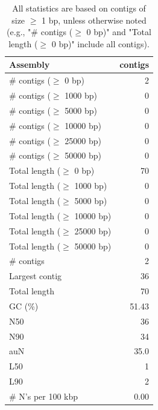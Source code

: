 \documentclass[12pt,a4paper]{article}
\begin{document}
\begin{table}[ht]
\begin{center}
\caption{All statistics are based on contigs of size $\geq$ 1 bp, unless otherwise noted (e.g., "\# contigs ($\geq$ 0 bp)" and "Total length ($\geq$ 0 bp)" include all contigs).}
\begin{tabular}{|l*{1}{|r}|}
\hline
Assembly & contigs \\ \hline
\# contigs ($\geq$ 0 bp) & 2 \\ \hline
\# contigs ($\geq$ 1000 bp) & 0 \\ \hline
\# contigs ($\geq$ 5000 bp) & 0 \\ \hline
\# contigs ($\geq$ 10000 bp) & 0 \\ \hline
\# contigs ($\geq$ 25000 bp) & 0 \\ \hline
\# contigs ($\geq$ 50000 bp) & 0 \\ \hline
Total length ($\geq$ 0 bp) & 70 \\ \hline
Total length ($\geq$ 1000 bp) & 0 \\ \hline
Total length ($\geq$ 5000 bp) & 0 \\ \hline
Total length ($\geq$ 10000 bp) & 0 \\ \hline
Total length ($\geq$ 25000 bp) & 0 \\ \hline
Total length ($\geq$ 50000 bp) & 0 \\ \hline
\# contigs & 2 \\ \hline
Largest contig & 36 \\ \hline
Total length & 70 \\ \hline
GC (\%) & 51.43 \\ \hline
N50 & 36 \\ \hline
N90 & 34 \\ \hline
auN & 35.0 \\ \hline
L50 & 1 \\ \hline
L90 & 2 \\ \hline
\# N's per 100 kbp & 0.00 \\ \hline
\end{tabular}
\end{center}
\end{table}
\end{document}
